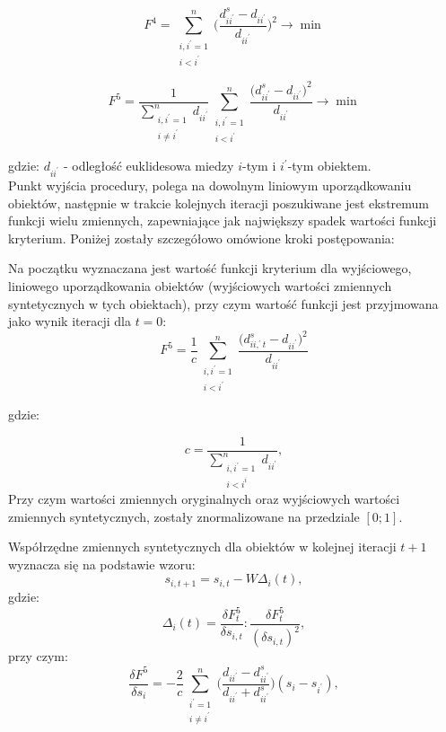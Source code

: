 \documentclass[12pt,a4paper]{report}
\begin{document}
\begin{equation}
F^{4}=\sum_{\substack{i,i^{'}=1 \\ i<i^{'}}}^{n} \bigg( \frac{d_{ii^{'}}^{s} - d_{ii^{'}}}{d_{ii^{'}}} \bigg) ^2  \rightarrow     \min  
\end{equation}

\begin{equation}
F^{5}=\frac{1}{\sum_ {\substack{i,i^{'}=1 \\ i\neq i^{'}}}^{n} d_{ii^{'}}} \sum_{\substack{i,i^{'}=1 \\ i<i^{'}}}^{n} \frac{\bigg(d_{ii^{'}}^{s} - d_{ii^{'}}\bigg)^2}{d_{ii^{'}}}\rightarrow     \min  
\end{equation}

gdzie:
\newline
$d_{ii^{'}}$ - odległość euklidesowa miedzy $i$-tym i $i^{'}$-tym obiektem.\\
\newline
Punkt wyjścia procedury, polega na dowolnym liniowym uporządkowaniu obiektów, następnie w trakcie kolejnych iteracji poszukiwane jest ekstremum funkcji wielu zmiennych, zapewniające jak największy spadek wartości funkcji kryterium. Poniżej zostały szczegółowo omówione kroki postępowania:

Na początku wyznaczana jest wartość funkcji kryterium dla wyjściowego, liniowego uporządkowania obiektów (wyjściowych wartości zmiennych syntetycznych w tych obiektach), przy czym wartość funkcji jest przyjmowana jako wynik iteracji dla $t = 0$:
\begin{equation}
F^{5}=\frac{1}{c} \sum_{\substack{i,i^{'}=1 \\ i<i^{'}}}^{n} \frac{\bigg(d_{ii,^{'}t}^{s} - d_{ii^{'}}\bigg)^2}{d_{ii^{'}}}
\end{equation}

gdzie:

\begin{equation}
c=\frac{1}{\sum_{\substack{i,i^{'}=1 \\ i<i^{i}}}^n d_{ii^{'}}},
\end{equation}
Przy czym wartości zmiennych oryginalnych oraz wyjściowych wartości zmiennych syntetycznych, zostały znormalizowane na przedziale $[0;1]$.

Współrzędne zmiennych syntetycznych dla obiektów w kolejnej iteracji $t+1$ wyznacza się na podstawie wzoru:
\begin{equation}
s_{i,t+1}=s_{i,t} - W\Delta_{i}(t),
\end{equation}
gdzie:
\begin{equation}
\Delta_{i}(t)=\frac{\delta F_{t}^{5}}{\delta s_{i,t}} : \frac{\delta F_{t}^{5}}{(\delta s_{i,t})^{2}},
\end{equation}
przy czym:
\begin{equation}
\frac{\delta F^{5}}{\delta s_{i}}=-\frac{2}{c}\sum_{\substack{i^{'}=1 \\ i \neq i^{'}}}^n \bigg( \frac{d_{ii^{'}} - d_{ii^{'}}^s}{d_{ii^{'}}+d_{ii^{'}}^{s}} \bigg)(s_{i} - s_{i^{'}}),
\end{equation}
\end{document}
